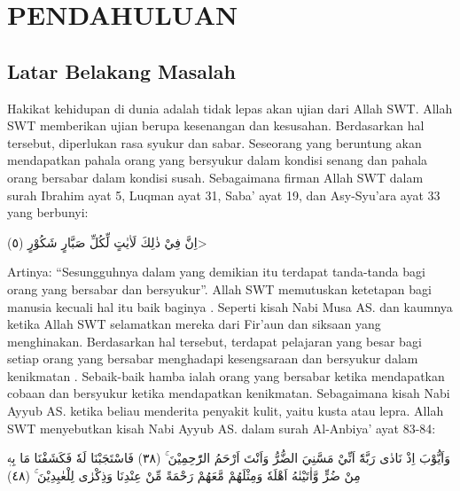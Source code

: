\chapter{PENDAHULUAN}
    \section{Latar Belakang Masalah}

    Hakikat kehidupan di dunia adalah tidak lepas akan ujian dari Allah SWT. Allah SWT memberikan ujian berupa kesenangan dan kesusahan. Berdasarkan hal tersebut, diperlukan rasa syukur dan sabar. Seseorang yang beruntung akan mendapatkan pahala orang yang bersyukur dalam kondisi senang dan pahala orang bersabar dalam kondisi susah. Sebagaimana firman Allah SWT dalam surah Ibrahim ayat 5, Luqman ayat 31, Saba’ ayat 19, dan Asy-Syu’ara ayat 33 yang berbunyi:

    \begin{flushright}
        \<اِنَّ فِيْ ذٰلِكَ لَاٰيٰتٍ لِّكُلِّ صَبَّارٍ شَكُوْرٍ (٥)>
    \end{flushright}

    Artinya: “Sesungguhnya dalam yang demikian itu terdapat tanda-tanda bagi orang yang bersabar dan bersyukur”. Allah SWT memutuskan ketetapan bagi manusia kecuali hal itu baik baginya \citep{Ramdhan2019}. Seperti kisah Nabi Musa AS. dan kaumnya ketika Allah SWT selamatkan mereka dari Fir’aun dan siksaan yang menghinakan. Berdasarkan hal tersebut, terdapat pelajaran yang besar bagi setiap orang yang bersabar menghadapi kesengsaraan dan bersyukur dalam kenikmatan \citep{Muaziroh2018}. Sebaik-baik hamba ialah orang yang bersabar ketika mendapatkan cobaan dan bersyukur ketika mendapatkan kenikmatan. Sebagaimana kisah Nabi Ayyub AS. ketika beliau menderita penyakit kulit, yaitu kusta atau lepra. Allah SWT menyebutkan kisah Nabi Ayyub AS. dalam surah Al-Anbiya’ ayat 83-84:

    \begin{flushright}
        \begin{RLtext}
            وَاَيُّوْبَ اِذْ نَادٰى رَبَّهٗٓ اَنِّيْ مَسَّنِيَ الضُّرُّ وَاَنْتَ اَرْحَمُ الرّٰحِمِيْنَ ۚ (٣٨) فَاسْتَجَبْنَا لَهٗ فَكَشَفْنَا مَا بِهٖ مِنْ ضُرٍّ وَّاٰتَيْنٰهُ اَهْلَهٗ وَمِثْلَهُمْ مَّعَهُمْ رَحْمَةً مِّنْ عِنْدِنَا وَذِكْرٰى لِلْعٰبِدِيْنَ ۚ (٤٨)
        \end{RLtext}
    \end{flushright}

